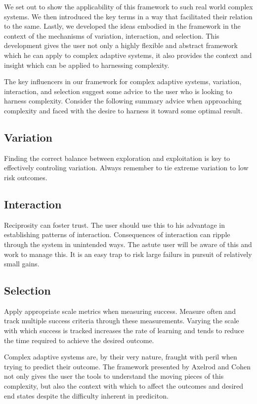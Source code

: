 \documentclass[jou,apacite]{apa6}
\begin{document}
We set out to show the applicability of this framework to such real world complex systems.  We then introduced the key terms in a way that facilitated their relation to the same.  Lastly, we developed the ideas embodied in the framework in the context of the mechanisms of variation, interaction, and selection.  This development gives the user not only a highly flexible and abstract framework which he can apply to complex adaptive systems, it also provides the context and insight
which can be applied to harnessing complexity.

The key influencers in our framework for complex adaptive systems, variation, interaction, and selection suggest some advice to the user who is looking to harness complexity.  Consider the following summary advice when approaching complexity and faced with the desire to harness it toward some optimal result.

\subsection{Variation}
Finding the correct balance between exploration and exploitation is key to effectively controling variation.  Always remember to tie extreme variation to low risk outcomes.

\subsection{Interaction}
Reciprosity can foster trust.  The user should use this to his advantage in establishing patterns of interaction.  Consequences of interaction can ripple through the system in unintended ways.  The astute user will be aware of this and work to manage this.  It is an easy trap to risk large failurs in pursuit of relatively small gains.

\subsection{Selection}
Apply appropriate scale metrics when measuring success.  Measure often and track multiple success criteria through these measurements.  Varying the scale with which success is tracked increases the rate of learning and tends to reduce the time required to achieve the desired outcome.

Complex adaptive systems are, by their very nature, fraught with peril when trying to predict their outcome.  The framework presented by Axelrod and Cohen not only gives the user the tools to understand the moving pieces of this complexity, but also the context with which to affect the outcomes and desired end states despite the difficulty inherent in prediciton.


\end{document}
